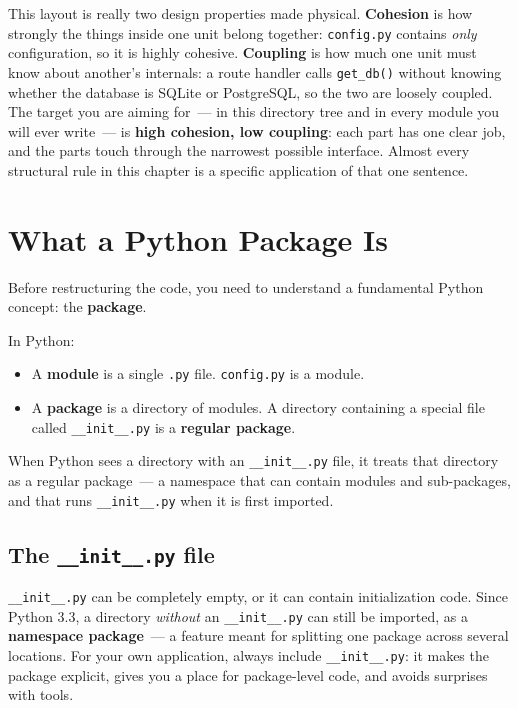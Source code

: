 \noindent{}This layout is really two design properties made physical. \textbf{Cohesion} is how strongly the things inside one unit belong together: \texttt{config.py} contains \emph{only} configuration, so it is highly cohesive. \textbf{Coupling} is how much one unit must know about another's internals: a route handler calls \texttt{get\_db()} without knowing whether the database is SQLite or PostgreSQL, so the two are loosely coupled. The target you are aiming for~--- in this directory tree and in every module you will ever write~--- is \textbf{high cohesion, low coupling}: each part has one clear job, and the parts touch through the narrowest possible interface. Almost every structural rule in this chapter is a specific application of that one sentence.

\setcounter{section}{2}
\section{What a Python Package Is}\label{15-structuring-the-application:153-what-a-python-package-is}

Before restructuring the code, you need to understand a fundamental Python concept: the \textbf{package}.

In Python:

\begin{itemize}
\tightlist
\item
  A \textbf{module} is a single \texttt{.py} file. \texttt{config.py} is a module.
\item
  A \textbf{package} is a directory of modules. A directory containing a special file called \texttt{\_\_init\_\_.py} is a \textbf{regular package}.
\end{itemize}

\noindent{}When Python sees a directory with an \texttt{\_\_init\_\_.py} file, it treats that directory as a regular package~--- a namespace that can contain modules and sub-packages, and that runs \texttt{\_\_init\_\_.py} when it is first imported.

\subsection*{\texorpdfstring{The \texttt{\_\_init\_\_.py} file}{The \_\_init\_\_.py file}}\label{15-structuring-the-application:the---init--py-file}

\texttt{\_\_init\_\_.py} can be completely empty, or it can contain initialization code. Since Python 3.3, a directory \emph{without} an \texttt{\_\_init\_\_.py} can still be imported, as a \textbf{namespace package}~--- a feature meant for splitting one package across several locations. For your own application, always include \texttt{\_\_init\_\_.py}: it makes the package explicit, gives you a place for package-level code, and avoids surprises with tools.


